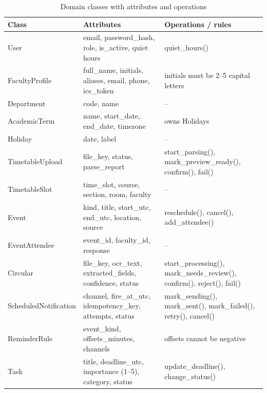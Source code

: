 {\small
\begin{xltabular}{\textwidth}{|p{3.3cm}|Y|Y|}
\caption{Domain classes with attributes and operations}\\
\hline
\textbf{Class} & \textbf{Attributes} & \textbf{Operations / rules} \\ \hline
User & email, password\_hash, role, is\_active, quiet hours & quiet\_hours() \\ \hline
FacultyProfile & full\_name, initials, aliases, email, phone, ics\_token & initials must be 2--5 capital letters \\ \hline
Department & code, name & -- \\ \hline
AcademicTerm & name, start\_date, end\_date, timezone & owns Holidays \\ \hline
Holiday & date, label & -- \\ \hline
TimetableUpload & file\_key, status, parse\_report & start\_parsing(), mark\_preview\_ready(), confirm(), fail() \\ \hline
TimetableSlot & time\_slot, course, section, room, faculty & -- \\ \hline
Event & kind, title, start\_utc, end\_utc, location, source & reschedule(), cancel(), add\_attendee() \\ \hline
EventAttendee & event\_id, faculty\_id, response & -- \\ \hline
Circular & file\_key, ocr\_text, extracted\_fields, confidence, status & start\_processing(), mark\_needs\_review(), confirm(), reject(), fail() \\ \hline
ScheduledNotification & channel, fire\_at\_utc, idempotency\_key, attempts, status & mark\_sending(), mark\_sent(), mark\_failed(), retry(), cancel() \\ \hline
ReminderRule & event\_kind, offsets\_minutes, channels & offsets cannot be negative \\ \hline
Task & title, deadline\_utc, importance (1--5), category, status & update\_deadline(), change\_status() \\ \hline
\end{xltabular}}

